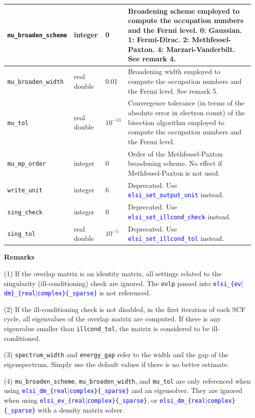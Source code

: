 \documentclass{report}
\newcommand{\api}[1]{\textcolor{blue}{\texttt{#1}}}
\begin{document}
\begin{longtable}[]{|p{30mm}|p{20mm}|p{15mm}|p{97mm}|}
\hline
\texttt{mu\_broaden\_scheme} & integer     & 0           & Broadening scheme employed to compute the occupation numbers and the Fermi level. 0: Gaussian. 1: Fermi-Dirac. 2: Methfessel-Paxton. 4: Marzari-Vanderbilt. See remark 4.\\
\hline
\texttt{mu\_broaden\_width}  & real double & 0.01        & Broadening width employed to compute the occupation numbers and the Fermi level. See remark 5.\\
\hline
\texttt{mu\_tol}             & real double & $10^{-13}$  & Convergence tolerance (in terms of the absolute error in electron count) of the bisection algorithm employed to compute the occupation numbers and the Fermi level.\\
\hline
\texttt{mu\_mp\_order}       & integer     & 0           & Order of the Methfessel-Paxton broadening scheme. No effect if Methfessel-Paxton is not used.\\
\hline
\texttt{write\_unit}         & integer     & 6           & Deprecated. Use \api{elsi\_set\_output\_unit} instead.\\
\hline
\texttt{sing\_check}         & integer     & 0           & Deprecated. Use \api{elsi\_set\_illcond\_check} instead.\\
\hline
\texttt{sing\_tol}           & real double & $10^{-5}$   & Deprecated. Use \api{elsi\_set\_illcond\_tol} instead.\\
\hline
\end{longtable}

\textbf{Remarks}

(1) If the overlap matrix is an identity matrix, all settings related to the singularity (ill-conditioning) check are ignored. The \texttt{ovlp} passed into \api{elsi\_\{ev$\vert$dm\}\_\{real$\vert$complex\}\{\_sparse\}} is not referenced.

(2) If the ill-conditioning check is not disabled, in the first iteration of each SCF cycle, all eigenvalues of the overlap matrix are computed. If there is any eigenvalue smaller than \texttt{illcond\_tol}, the matrix is considered to be ill-conditioned.

(3) \texttt{spectrum\_width} and \texttt{energy\_gap} refer to the width and the gap of the eigenspectrum. Simply use the default values if there is no better estimate.

(4) \texttt{mu\_broaden\_scheme}, \texttt{mu\_broaden\_width}, and  \texttt{mu\_tol} are only referenced when using \api{elsi\_dm\_\{real$\vert$complex\}\{\_sparse\}} and an eigensolver. They are ignored when using \api{elsi\_ev\_\{real$\vert$complex\}\{\_sparse\}}, or \api{elsi\_dm\_\{real$\vert$complex\}\{\_sparse\}} with a density matrix solver.
\end{document}
